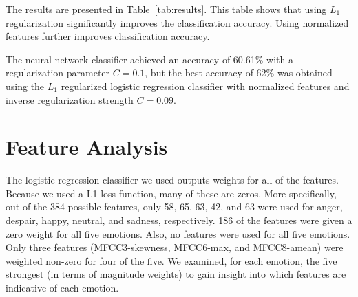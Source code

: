 \documentclass[twocolumn, 11pt]{article}
\begin{document}

The results are presented in Table~\ref{tab:results}. This table shows that
using $L_1$ regularization significantly improves the classification accuracy.
Using normalized features further improves classification accuracy.

The neural network classifier achieved an accuracy of 60.61\% with a
regularization parameter $C=0.1$, but the best accuracy of 62\% was obtained
using the $L_1$ regularized logistic regression classifier with normalized
features and inverse regularization strength $C=0.09$.

\section{Feature Analysis}

The logistic regression classifier we used outputs weights for all of the
features. Because we used a L1-loss function, many of these are zeros. More
specifically, out of the 384 possible features, only 58, 65, 63, 42, and 63
were used for anger, despair, happy, neutral, and sadness, respectively. 186 of
the features were given a zero weight for all five emotions. Also, no features
were used for all five emotions. Only three features (MFCC3-skewness,
MFCC6-max, and MFCC8-amean) were weighted non-zero for four of the five. We
examined, for each emotion, the five strongest (in terms of magnitude weights)
to gain insight into which features are indicative of each emotion.
\end{document}
